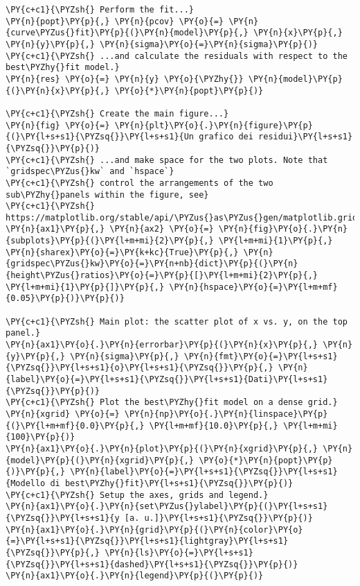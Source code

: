 \begin{Verbatim}[label=\makebox{\href{https://github.com/unipi-physics-labs/lab1-notes/tree/main/snippy/residual_plot.py}{https://github.com/.../residual\_plot.py}},commandchars=\\\{\}]
\PY{c+c1}{\PYZsh{} Perform the fit...}
\PY{n}{popt}\PY{p}{,} \PY{n}{pcov} \PY{o}{=} \PY{n}{curve\PYZus{}fit}\PY{p}{(}\PY{n}{model}\PY{p}{,} \PY{n}{x}\PY{p}{,} \PY{n}{y}\PY{p}{,} \PY{n}{sigma}\PY{o}{=}\PY{n}{sigma}\PY{p}{)}
\PY{c+c1}{\PYZsh{} ...and calculate the residuals with respect to the best\PYZhy{}fit model.}
\PY{n}{res} \PY{o}{=} \PY{n}{y} \PY{o}{\PYZhy{}} \PY{n}{model}\PY{p}{(}\PY{n}{x}\PY{p}{,} \PY{o}{*}\PY{n}{popt}\PY{p}{)}

\PY{c+c1}{\PYZsh{} Create the main figure...}
\PY{n}{fig} \PY{o}{=} \PY{n}{plt}\PY{o}{.}\PY{n}{figure}\PY{p}{(}\PY{l+s+s1}{\PYZsq{}}\PY{l+s+s1}{Un grafico dei residui}\PY{l+s+s1}{\PYZsq{}}\PY{p}{)}
\PY{c+c1}{\PYZsh{} ...and make space for the two plots. Note that `gridspec\PYZus{}kw` and `hspace`}
\PY{c+c1}{\PYZsh{} control the arrangements of the two sub\PYZhy{}panels within the figure, see}
\PY{c+c1}{\PYZsh{} https://matplotlib.org/stable/api/\PYZus{}as\PYZus{}gen/matplotlib.gridspec.GridSpec.html}
\PY{n}{ax1}\PY{p}{,} \PY{n}{ax2} \PY{o}{=} \PY{n}{fig}\PY{o}{.}\PY{n}{subplots}\PY{p}{(}\PY{l+m+mi}{2}\PY{p}{,} \PY{l+m+mi}{1}\PY{p}{,} \PY{n}{sharex}\PY{o}{=}\PY{k+kc}{True}\PY{p}{,} \PY{n}{gridspec\PYZus{}kw}\PY{o}{=}\PY{n+nb}{dict}\PY{p}{(}\PY{n}{height\PYZus{}ratios}\PY{o}{=}\PY{p}{[}\PY{l+m+mi}{2}\PY{p}{,} \PY{l+m+mi}{1}\PY{p}{]}\PY{p}{,} \PY{n}{hspace}\PY{o}{=}\PY{l+m+mf}{0.05}\PY{p}{)}\PY{p}{)}

\PY{c+c1}{\PYZsh{} Main plot: the scatter plot of x vs. y, on the top panel.}
\PY{n}{ax1}\PY{o}{.}\PY{n}{errorbar}\PY{p}{(}\PY{n}{x}\PY{p}{,} \PY{n}{y}\PY{p}{,} \PY{n}{sigma}\PY{p}{,} \PY{n}{fmt}\PY{o}{=}\PY{l+s+s1}{\PYZsq{}}\PY{l+s+s1}{o}\PY{l+s+s1}{\PYZsq{}}\PY{p}{,} \PY{n}{label}\PY{o}{=}\PY{l+s+s1}{\PYZsq{}}\PY{l+s+s1}{Dati}\PY{l+s+s1}{\PYZsq{}}\PY{p}{)}
\PY{c+c1}{\PYZsh{} Plot the best\PYZhy{}fit model on a dense grid.}
\PY{n}{xgrid} \PY{o}{=} \PY{n}{np}\PY{o}{.}\PY{n}{linspace}\PY{p}{(}\PY{l+m+mf}{0.0}\PY{p}{,} \PY{l+m+mf}{10.0}\PY{p}{,} \PY{l+m+mi}{100}\PY{p}{)}
\PY{n}{ax1}\PY{o}{.}\PY{n}{plot}\PY{p}{(}\PY{n}{xgrid}\PY{p}{,} \PY{n}{model}\PY{p}{(}\PY{n}{xgrid}\PY{p}{,} \PY{o}{*}\PY{n}{popt}\PY{p}{)}\PY{p}{,} \PY{n}{label}\PY{o}{=}\PY{l+s+s1}{\PYZsq{}}\PY{l+s+s1}{Modello di best\PYZhy{}fit}\PY{l+s+s1}{\PYZsq{}}\PY{p}{)}
\PY{c+c1}{\PYZsh{} Setup the axes, grids and legend.}
\PY{n}{ax1}\PY{o}{.}\PY{n}{set\PYZus{}ylabel}\PY{p}{(}\PY{l+s+s1}{\PYZsq{}}\PY{l+s+s1}{y [a. u.]}\PY{l+s+s1}{\PYZsq{}}\PY{p}{)}
\PY{n}{ax1}\PY{o}{.}\PY{n}{grid}\PY{p}{(}\PY{n}{color}\PY{o}{=}\PY{l+s+s1}{\PYZsq{}}\PY{l+s+s1}{lightgray}\PY{l+s+s1}{\PYZsq{}}\PY{p}{,} \PY{n}{ls}\PY{o}{=}\PY{l+s+s1}{\PYZsq{}}\PY{l+s+s1}{dashed}\PY{l+s+s1}{\PYZsq{}}\PY{p}{)}
\PY{n}{ax1}\PY{o}{.}\PY{n}{legend}\PY{p}{(}\PY{p}{)}


\end{Verbatim}
